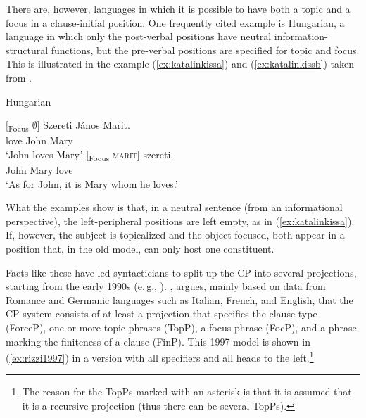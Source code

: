 There are, however, languages in which it is possible to have both a topic and a focus in a clause-initial position. One frequently cited example is Hungarian, a language in which only the post-verbal positions have neutral information-structural functions, but the pre-verbal positions are specified for topic and focus. This is illustrated in the example (\ref{ex:katalinkissa}) and (\ref{ex:katalinkissb}) taken from \citet{kiss1981structural}.


\begin{exe}
\ex Hungarian \citep{kiss1981structural} \begin{xlist} 
\ex {} {$[$\textsubscript{Focus} $\emptyset ]$} {Szereti} {János} {Marit.} \\
{} {} {love} {John} {Mary} \\
\trans `John loves Mary.' \label{ex:katalinkissa}
\ex {} {$[$\textsubscript{Focus} \textsc{marit}$]$} {szereti.}  \\
{\hspace*{\fill} John} {Mary} {love}  \\
\trans `As for John, it is Mary whom he loves.' \label{ex:katalinkissb}
\end{xlist}
\end{exe}

\noindent What the examples show is that, in a neutral sentence (from an informational perspective), the left-peripheral positions are left empty, as in (\ref{ex:katalinkissa}). If, however, the subject is topicalized and the object focused, both appear in a position that, in the old model, can only host one constituent. 


Facts like these have led syntacticians to split up the CP into several projections, starting from the early 1990s (e.\,g., \citealt{authier1992iterated, hoekstra1993dialectal}). \citet{rizzi1997fine}, argues, mainly based on data from Romance and Germanic languages such as Italian, French, and English, that the CP system consists of at least a projection that specifies the clause type (ForceP), one or more topic phrases (TopP), a focus phrase (FocP), and a phrase marking the finiteness of a clause (FinP). This 1997 model is shown in (\ref{ex:rizzi1997}) in a version with all specifiers and all heads to the left.\footnote{ The reason for the TopPs marked with an asterisk is that it is assumed that it is a recursive projection (thus there can be several TopPs).}

